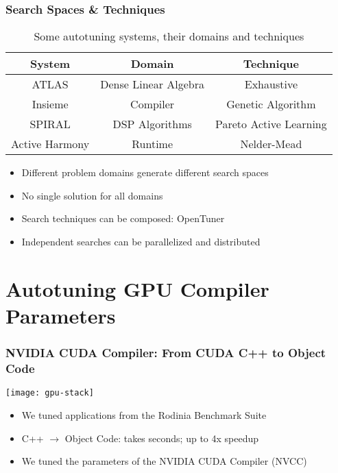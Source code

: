 \documentclass[10pt, compress, aspectratio=169]{beamer}
\begin{document}
\begin{frame}
    \frametitle{Search Spaces \& Techniques}
    \begin{table}[]
        \centering
        \begin{tabular}{@{}ccc@{}}
            \toprule
            System & Domain & Technique \\ \midrule
            ATLAS & Dense Linear Algebra & Exhaustive \\
            Insieme & Compiler & Genetic Algorithm \\
            SPIRAL & DSP Algorithms & Pareto Active Learning \\
            Active Harmony & Runtime & Nelder-Mead \\ \bottomrule
        \end{tabular}
        \caption{Some autotuning systems, their domains and techniques}
    \end{table}

    \begin{itemize}
        \item Different \alert{problem domains} generate different \alert{search spaces}
        \item \alert{No single solution} for all domains
        \item Search techniques can be composed: \alert{OpenTuner}
        \item Independent searches can be \alert{parallelized and distributed}
    \end{itemize}
\end{frame}


\section{Autotuning GPU Compiler Parameters}

\begin{frame}
    \frametitle{NVIDIA CUDA Compiler: From CUDA C++ to Object Code}
    \begin{center}
        \texttt{[image: gpu-stack]}
    \end{center}

    \begin{itemize}
        \item We tuned applications from the \alert{Rodinia Benchmark Suite}
        \item C++ $\rightarrow$ Object Code: takes \alert{seconds}; \alert{up to 4x speedup}
        \item We \alert{tuned the parameters} of the NVIDIA CUDA Compiler (NVCC)
    \end{itemize}
\end{frame}
\end{document}
